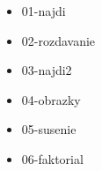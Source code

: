 



\begin{itemize}
\item 01-najdi
\item 02-rozdavanie
\item 03-najdi2
\item 04-obrazky
\item 05-susenie
\item 06-faktorial
\end{itemize}

